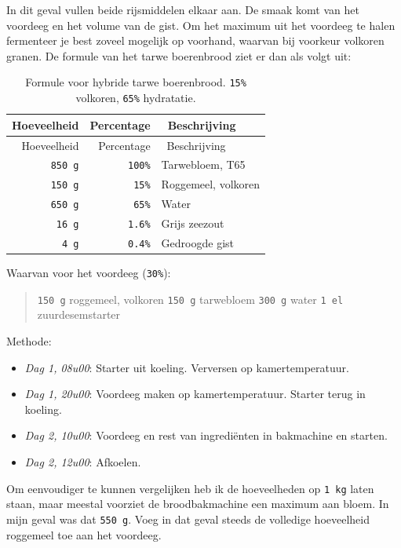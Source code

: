 \documentclass[
  11pt,
  dutch,
]{memoir}
\providecommand{\tightlist}{%
  \setlength{\itemsep}{0pt}\setlength{\parskip}{0pt}}
\begin{document}
In dit geval vullen beide rijsmiddelen elkaar aan. De smaak komt van het
voordeeg en het volume van de gist. Om het maximum uit het voordeeg te
halen fermenteer je best zoveel mogelijk op voorhand, waarvan bij
voorkeur volkoren granen. De formule van het tarwe boerenbrood ziet er
dan als volgt uit:

\begin{longtable}[]{@{}rrl@{}}
\caption{Formule voor hybride tarwe boerenbrood. \texttt{15\%} volkoren,
\texttt{65\%} hydratatie.}\tabularnewline
\toprule
Hoeveelheid & Percentage & ~Beschrijving\tabularnewline
\midrule
\endfirsthead
\toprule
Hoeveelheid & Percentage & ~Beschrijving\tabularnewline
\midrule
\endhead
\texttt{850\ g} & \texttt{100\%} & Tarwebloem, T65\tabularnewline
\texttt{150\ g} & \texttt{15\%} & Roggemeel, volkoren\tabularnewline
\texttt{650\ g} & \texttt{65\%} & Water\tabularnewline
\texttt{16\ g} & \texttt{1.6\%} & Grijs zeezout\tabularnewline
\texttt{4\ g} & \texttt{0.4\%} & Gedroogde gist\tabularnewline
\bottomrule
\end{longtable}

Waarvan voor het voordeeg (\texttt{30\%}):

\begin{quote}
\texttt{150\ g} roggemeel, volkoren \newline \texttt{150\ g} tarwebloem
\newline \texttt{300\ g} water \newline \texttt{1\ el} zuurdesemstarter
\end{quote}

Methode:

\begin{itemize}
\tightlist
\item
  \emph{Dag 1, 08u00}: Starter uit koeling. Verversen op
  kamertemperatuur.
\item
  \emph{Dag 1, 20u00}: Voordeeg maken op kamertemperatuur. Starter terug
  in koeling.
\item
  \emph{Dag 2, 10u00}: Voordeeg en rest van ingrediënten in bakmachine
  en starten.
\item
  \emph{Dag 2, 12u00}: Afkoelen.
\end{itemize}

Om eenvoudiger te kunnen vergelijken heb ik de hoeveelheden op
\texttt{1\ kg} laten staan, maar meestal voorziet de broodbakmachine een
maximum aan bloem. In mijn geval was dat \texttt{550\ g}. Voeg in dat
geval steeds de volledige hoeveelheid roggemeel toe aan het voordeeg.
\end{document}
